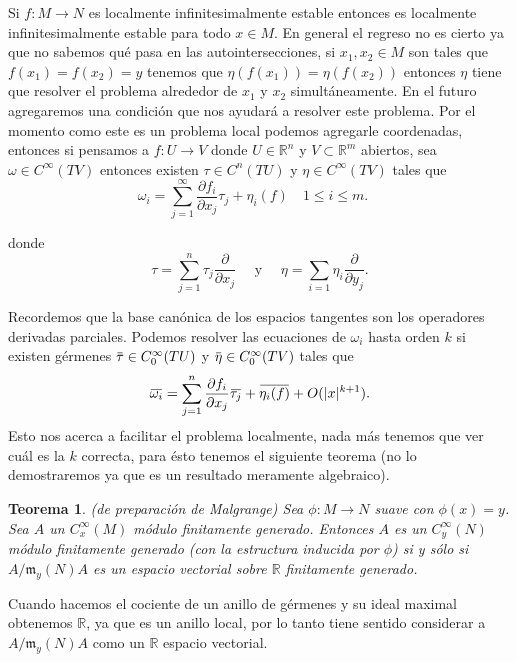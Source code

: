 \documentclass{report}
\newtheorem{theorem}{Teorema}[section]
\theoremstyle{definition}
\newcommand{\overbar}[1]{\mkern 1.5mu\overline{\mkern-1.5mu#1\mkern-1.5mu}\mkern 1.5mu}
\begin{document}
Si $f:M \to N$ es localmente infinitesimalmente estable entonces es localmente infinitesimalmente estable para todo $x \in M$. En general el regreso no es cierto ya que no sabemos qu\'e pasa en las autointersecciones, si $x_1, x_2 \in M$ son tales que $f(x_1) = f(x_2) = y$ tenemos que $\eta (f(x_1)) = \eta (f(x_2))$ entonces $\eta$ tiene que resolver el problema alrededor de $x_1$ y $x_2$ simult\'aneamente. En el futuro agregaremos una condici\'on que nos ayudar\'a a resolver este problema. Por el momento como este es un problema local podemos agregarle coordenadas, entonces si pensamos a $f: U \to V$ donde $U \in \mathbb{R}^n$ y $V \subset \mathbb{R}^m$ abiertos, sea $\omega \in C^\infty (TV)$ entonces existen $\tau \in C^n (TU)$ y $\eta \in C^\infty (TV)$ tales que \begin{equation}\omega_i = \sum\limits_{j =1}^\infty \frac{\partial f_i }{\partial x_j} \tau_j + \eta_i (f) \quad 1 \leq i \leq m. \quad \tag{*}\label{xd} \end{equation}

donde $$\tau = \sum\limits_{j=1}^n \tau_j \frac{\partial}{\partial x_j} \quad  \text{     y      } \quad  \eta=           \sum\limits_{i=1}  \eta_i \frac{\partial}{\partial y_j}.$$

Recordemos que la base can\'onica de los espacios tangentes son los operadores derivadas parciales. Podemos resolver las ecuaciones de $\omega_i$ hasta orden $k$ si existen g\'ermenes $\overbar{\tau} \in C^\infty_0 (TU) $ y $\overbar{\eta} \in C^\infty_0 (TV)$ tales que $$\overbar{\omega_i} = \sum\limits_{j=1}^n \frac{\partial f_i}{\partial x_j}\overbar{\tau_j} +\overbar{ \eta_i (f)} + O(\vert x \vert^{k+1}).$$
Esto nos acerca a facilitar el problema localmente, nada m\'as tenemos que ver cu\'al es la $k$ correcta, para \'esto tenemos el siguiente teorema (no lo demostraremos ya que es un resultado meramente algebraico).

\begin{theorem}
(de preparaci\'on de Malgrange) Sea $\phi: M \to N$ suave con $\phi (x) = y$. Sea $A $ un $C^\infty_x (M)$ m\'odulo finitamente generado. Entonces $A$ es un $C^\infty_y (N)$ m\'odulo finitamente generado (con la estructura inducida por $\phi$) si y s\'olo si $A/\mathfrak{m}_y (N) A$ es un espacio vectorial sobre $\mathbb{R}$ finitamente generado.
\end{theorem}

Cuando hacemos el cociente de un anillo de g\'ermenes y su ideal maximal obtenemos $\mathbb{R}$, ya que es un anillo local, por lo tanto tiene sentido considerar a $A/\mathfrak{m}_y (N) A$ como un $\mathbb{R}$ espacio vectorial. 
\end{document}

